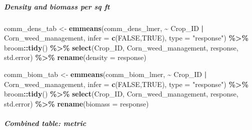 \documentclass[
]{article}
\newenvironment{Shaded}{\begin{snugshade}}{\end{snugshade}}
\newcommand{\AttributeTok}[1]{\textcolor[rgb]{0.13,0.29,0.53}{#1}}
\newcommand{\ConstantTok}[1]{\textcolor[rgb]{0.56,0.35,0.01}{#1}}
\newcommand{\FunctionTok}[1]{\textcolor[rgb]{0.13,0.29,0.53}{\textbf{#1}}}
\newcommand{\NormalTok}[1]{#1}
\newcommand{\OtherTok}[1]{\textcolor[rgb]{0.56,0.35,0.01}{#1}}
\newcommand{\SpecialCharTok}[1]{\textcolor[rgb]{0.81,0.36,0.00}{\textbf{#1}}}
\newcommand{\StringTok}[1]{\textcolor[rgb]{0.31,0.60,0.02}{#1}}
\begin{document}
\subparagraph{Density and biomass per sq ft}\label{density-and-biomass-per-sq-ft}

\begin{Shaded}
\begin{Highlighting}[]
\NormalTok{comm\_dens\_tab }\OtherTok{\textless{}{-}} \FunctionTok{emmeans}\NormalTok{(comm\_dens\_lmer, }\SpecialCharTok{\textasciitilde{}}\NormalTok{ Crop\_ID }\SpecialCharTok{|}\NormalTok{ Corn\_weed\_management,  }\AttributeTok{infer =} \FunctionTok{c}\NormalTok{(}\ConstantTok{FALSE}\NormalTok{,}\ConstantTok{TRUE}\NormalTok{),  }\AttributeTok{type =} \StringTok{"response"}\NormalTok{) }\SpecialCharTok{\%\textgreater{}\%}
\NormalTok{  broom}\SpecialCharTok{::}\FunctionTok{tidy}\NormalTok{() }\SpecialCharTok{\%\textgreater{}\%}
  \FunctionTok{select}\NormalTok{(Crop\_ID, Corn\_weed\_management, response, std.error) }\SpecialCharTok{\%\textgreater{}\%}
  \FunctionTok{rename}\NormalTok{(}\AttributeTok{density =}\NormalTok{ response)}
\end{Highlighting}
\end{Shaded}

\begin{Shaded}
\begin{Highlighting}[]
\NormalTok{comm\_biom\_tab }\OtherTok{\textless{}{-}} \FunctionTok{emmeans}\NormalTok{(comm\_biom\_lmer, }\SpecialCharTok{\textasciitilde{}}\NormalTok{ Crop\_ID }\SpecialCharTok{|}\NormalTok{ Corn\_weed\_management,  }\AttributeTok{infer =} \FunctionTok{c}\NormalTok{(}\ConstantTok{FALSE}\NormalTok{,}\ConstantTok{TRUE}\NormalTok{),  }\AttributeTok{type =} \StringTok{"response"}\NormalTok{) }\SpecialCharTok{\%\textgreater{}\%}
\NormalTok{  broom}\SpecialCharTok{::}\FunctionTok{tidy}\NormalTok{()  }\SpecialCharTok{\%\textgreater{}\%}
  \FunctionTok{select}\NormalTok{(Crop\_ID, Corn\_weed\_management, response, std.error) }\SpecialCharTok{\%\textgreater{}\%}
  \FunctionTok{rename}\NormalTok{(}\AttributeTok{biomass =}\NormalTok{ response)}
\end{Highlighting}
\end{Shaded}

\subparagraph{Combined table: metric}\label{combined-table-metric}
\end{document}
